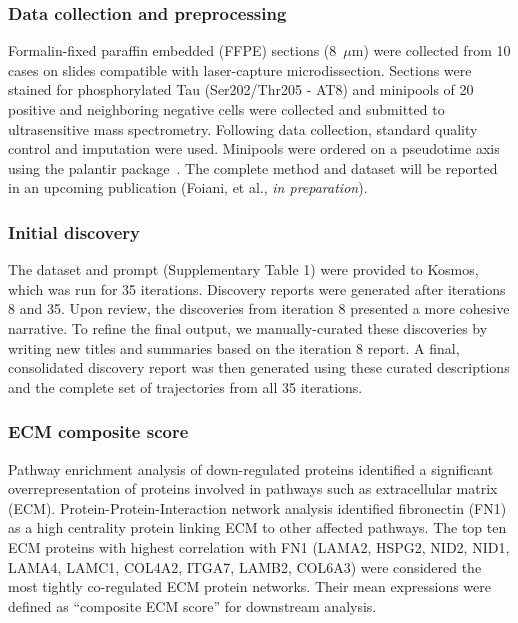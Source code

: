 \documentclass{article}
\begin{document}
\subsubsection{Data collection and preprocessing}

Formalin-fixed paraffin embedded (FFPE) sections (8~$\mu$m) were collected from 10 cases on slides compatible with laser-capture microdissection. Sections were stained for phosphorylated Tau (Ser202/Thr205 - AT8) and minipools of 20 positive and neighboring negative cells were collected and submitted to ultrasensitive mass spectrometry. Following data collection, standard quality control and imputation were used. Minipools were ordered on a pseudotime axis using the palantir package~\cite{setty_characterization_2019}. The complete method and dataset will be reported in an upcoming publication (Foiani, et al., \textit{in preparation}).

\subsubsection{Initial discovery}

The dataset and prompt (Supplementary Table 1) were provided to Kosmos, which was run for 35 iterations. Discovery reports were generated after iterations 8 and 35. Upon review, the discoveries from iteration 8 presented a more cohesive narrative. To refine the final output, we manually-curated these discoveries by writing new titles and summaries based on the iteration 8 report. A final, consolidated discovery report was then generated using these curated descriptions and the complete set of trajectories from all 35 iterations.

\subsubsection{ECM composite score}

Pathway enrichment analysis of down-regulated proteins identified a significant overrepresentation of proteins involved in pathways such as extracellular matrix (ECM). Protein-Protein-Interaction network analysis identified fibronectin (FN1) as a high centrality protein linking ECM to other affected pathways. The top ten ECM proteins with highest correlation with FN1 (LAMA2, HSPG2, NID2, NID1, LAMA4, LAMC1, COL4A2, ITGA7, LAMB2, COL6A3) were considered the most tightly co-regulated ECM protein networks. Their mean expressions were defined as “composite ECM score” for downstream analysis.
\end{document}

